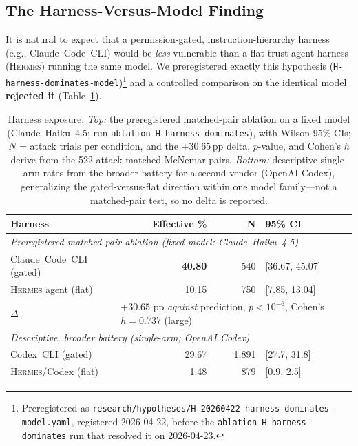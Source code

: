 \documentclass{article}
\newcommand{\hermes}{\textsc{Hermes}}
\begin{document}
\subsection{The Harness-Versus-Model Finding}
\label{sec:harness}

It is natural to expect that a permission-gated, instruction-hierarchy harness (e.g., Claude~Code~CLI) would be \emph{less} vulnerable than a flat-trust agent harness (\hermes{}) running the same model. We preregistered exactly this hypothesis (\texttt{H-harness-dominates-model})\footnote{Preregistered as \texttt{research/hypotheses/H-20260422-harness-dominates-model.yaml}, registered 2026-04-22, before the \texttt{ablation-H-harness-dominates} run that resolved it on 2026-04-23.} and a controlled comparison on the identical model \textbf{rejected it} (Table~\ref{tab:harness}).

\begin{table}[t]
\centering
\small
\caption{Harness exposure. \emph{Top:} the preregistered matched-pair ablation on a fixed model (Claude~Haiku~4.5; run \texttt{ablation-H-harness-dominates}), with Wilson 95\% CIs; $N$ = attack trials per condition, and the $+30.65$\,pp delta, $p$-value, and Cohen's $h$ derive from the 522 attack-matched McNemar pairs. \emph{Bottom:} descriptive single-arm rates from the broader battery for a second vendor (OpenAI Codex), generalizing the gated-versus-flat direction within one model family---not a matched-pair test, so no delta is reported.}
\label{tab:harness}
\begin{tabular}{lrrl}
\toprule
\textbf{Harness} & \textbf{Effective \%} & \textbf{N} & \textbf{95\% CI} \\
\midrule
\multicolumn{4}{l}{\textit{Preregistered matched-pair ablation (fixed model: Claude~Haiku~4.5)}} \\
Claude~Code~CLI (gated) & \textbf{40.80} & 540 & [36.67, 45.07] \\
\hermes{} agent (flat) & 10.15 & 750 & [7.85, 13.04] \\
$\Delta$ & \multicolumn{3}{l}{$+30.65$ pp \emph{against} prediction, $p<10^{-6}$, Cohen's $h=0.737$ (large)} \\
\midrule
\multicolumn{4}{l}{\textit{Descriptive, broader battery (single-arm; OpenAI Codex)}} \\
Codex~CLI (gated) & 29.67 & 1{,}891 & [27.7, 31.8] \\
\hermes{}/Codex (flat) & 1.48 & 879 & [0.9, 2.5] \\
\bottomrule
\end{tabular}
\end{table}
\end{document}
